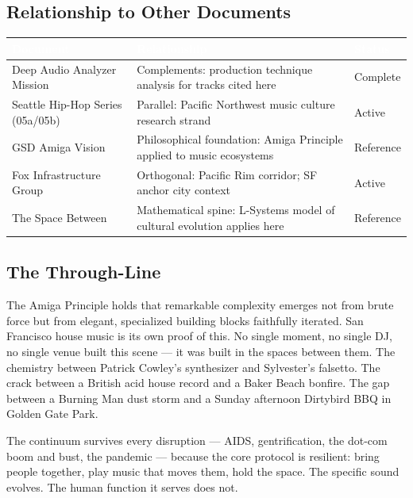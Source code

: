 \documentclass[11pt,letterpaper]{article}
\newcommand{\tableheader}[1]{\textbf{\sffamily\textcolor{white}{#1}}}
\begin{document}
\subsection{Relationship to Other Documents}

\begin{center}
\begin{tabularx}{\textwidth}{L{4cm}XC{2.5cm}}
\toprule
{}
\tableheader{Document} & \tableheader{Relationship} & \tableheader{Status} \\
\midrule
Deep Audio Analyzer Mission & Complements: production technique analysis for tracks cited here & Complete \\
Seattle Hip-Hop Series (05a/05b) & Parallel: Pacific Northwest music culture research strand & Active \\
GSD Amiga Vision & Philosophical foundation: Amiga Principle applied to music ecosystems & Reference \\
Fox Infrastructure Group & Orthogonal: Pacific Rim corridor; SF anchor city context & Active \\
The Space Between & Mathematical spine: L-Systems model of cultural evolution applies here & Reference \\
\bottomrule
\end{tabularx}
\end{center}

\subsection{The Through-Line}

The Amiga Principle holds that remarkable complexity emerges not from brute force but from elegant, specialized building blocks faithfully iterated. San Francisco house music is its own proof of this. No single moment, no single DJ, no single venue built this scene --- it was built in the spaces between them. The chemistry between Patrick Cowley's synthesizer and Sylvester's falsetto. The crack between a British acid house record and a Baker Beach bonfire. The gap between a Burning Man dust storm and a Sunday afternoon Dirtybird BBQ in Golden Gate Park.

The continuum survives every disruption --- AIDS, gentrification, the dot-com boom and bust, the pandemic --- because the core protocol is resilient: bring people together, play music that moves them, hold the space. The specific sound evolves. The human function it serves does not.
\end{document}

